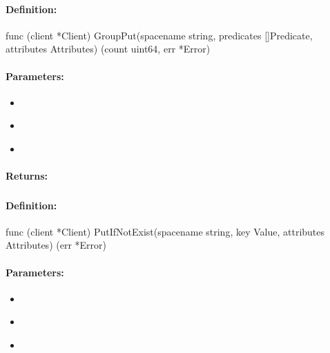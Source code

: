 \paragraph{Definition:}
\begin{gocode}
func (client *Client) GroupPut(spacename string, predicates []Predicate, attributes Attributes) (count uint64, err *Error)
\end{gocode}

\paragraph{Parameters:}
\begin{itemize}[noitemsep]
\item {}\\

\item {}\\

\item {}\\

\end{itemize}

\paragraph{Returns:}


\pagebreak
\subsubsection{}
\label{api:Go:PutIfNotExist}


\paragraph{Definition:}
\begin{gocode}
func (client *Client) PutIfNotExist(spacename string, key Value, attributes Attributes) (err *Error)
\end{gocode}

\paragraph{Parameters:}
\begin{itemize}[noitemsep]
\item {}\\

\item {}\\

\item {}\\

\end{itemize}

